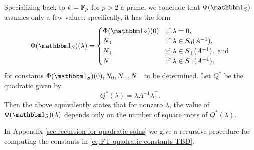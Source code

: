 Specializing back to $k=\mathbb{F}_p$ for $p>2$ a prime, we conclude that $\Phi(\IND_S)$ assumes only a few values: specifically, it has the form
\begin{equation}\label{eq:FT-quadratic-constants-TBD}
	\Phi(\IND_S)(\lambda) = \begin{cases}
		\Phi(\IND_S)(0) & \text{if } \lambda = 0,\\
		N_0 & \text{if } \lambda \in S_0(A^{-1}),\\
		N_+ & \text{if } \lambda \in S_+(A^{-1}), \text{ and}\\
		N_- & \text{if } \lambda \in S_-(A^{-1}),
	\end{cases}
\end{equation}
for constants $\Phi(\IND_S)(0), N_0, N_+, N_-$ to be determined. Let $Q^*$ be the quadratic given by
\[
	Q^*(\lambda) = \lambda A^{-1} \lambda^\top.
\]
Then the above equivalently states that for nonzero $\lambda$, the value of $\Phi(\IND_S)(\lambda)$ depends only on the number of square roots of $Q^*(\lambda)$.

In Appendix \ref{sec:recursion-for-quadratic-solns} we give a recursive procedure for computing the constants in \eqref{eq:FT-quadratic-constants-TBD}.